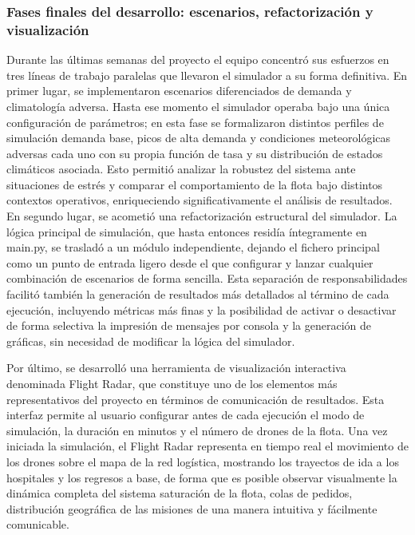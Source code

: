\documentclass[11pt, a4paper]{article} %
\begin{document}
\subsubsection{Fases finales del desarrollo: escenarios, refactorización y visualización}
Durante las últimas semanas del proyecto el equipo concentró sus esfuerzos en tres líneas de trabajo paralelas que llevaron el simulador a su forma definitiva. En primer lugar, se implementaron escenarios diferenciados de demanda y climatología adversa. Hasta ese momento el simulador operaba bajo una única configuración de parámetros; en esta fase se formalizaron distintos perfiles de simulación demanda base, picos de alta demanda y condiciones meteorológicas adversas cada uno con su propia función de tasa y su distribución de estados climáticos asociada. Esto permitió analizar la robustez del sistema ante situaciones de estrés y comparar el comportamiento de la flota bajo distintos contextos operativos, enriqueciendo significativamente el análisis de resultados. En segundo lugar, se acometió una refactorización estructural del simulador. La lógica principal de simulación, que hasta entonces residía íntegramente en main.py, se trasladó a un módulo independiente, dejando el fichero principal como un punto de entrada ligero desde el que configurar y lanzar cualquier combinación de escenarios de forma sencilla. Esta separación de responsabilidades facilitó también la generación de resultados más detallados al término de cada ejecución, incluyendo métricas más finas y la posibilidad de activar o desactivar de forma selectiva la impresión de mensajes por consola y la generación de gráficas, sin necesidad de modificar la lógica del simulador.

Por último, se desarrolló una herramienta de visualización interactiva denominada Flight Radar, que constituye uno de los elementos más representativos del proyecto en términos de comunicación de resultados. Esta interfaz permite al usuario configurar antes de cada ejecución el modo de simulación, la duración en minutos y el número de drones de la flota. Una vez iniciada la simulación, el Flight Radar representa en tiempo real el movimiento de los drones sobre el mapa de la red logística, mostrando los trayectos de ida a los hospitales y los regresos a base, de forma que es posible observar visualmente la dinámica completa del sistema saturación de la flota, colas de pedidos, distribución geográfica de las misiones de una manera intuitiva y fácilmente comunicable.
\end{document}
